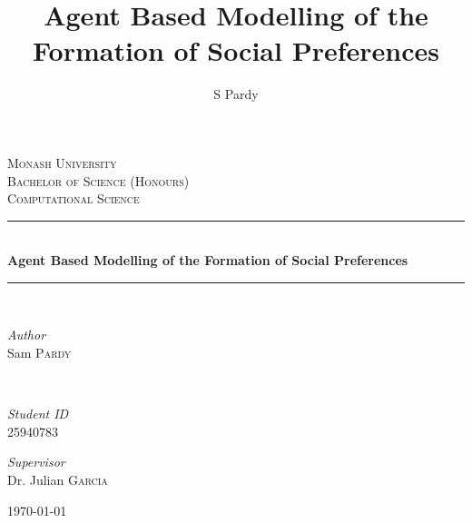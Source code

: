 \documentclass[11pt]{book}
\title{Agent Based Modelling of the Formation of Social Preferences}
\author{S Pardy}
\begin{document}
\begin{titlepage}
	\newcommand{\HRule}{\rule{\linewidth}{0.5mm}} %
	
	\center %
	
	
	\textsc{\LARGE Monash University}\\[1.5cm]	
	\textsc{\Large Bachelor of Science (Honours)}\\[0.5cm] %
	
	\textsc{\large Computational Science}\\[0.5cm] %
	
	
	\HRule\\[0.4cm]
	
	{\huge\bfseries Agent Based Modelling of the Formation of Social Preferences}\\[0.4cm]
	
	\HRule\\[1.5cm]
	
	
	\begin{minipage}{0.4\textwidth}
		\begin{flushleft}
			\large
			\textit{Author}\\
			Sam \textsc{Pardy}
		\end{flushleft}
	\end{minipage}
	~
	\begin{minipage}{0.4\textwidth}
		\begin{flushright}
			\large 
			\textit{Student ID}\\
		25940783   
		\end{flushright}
	\end{minipage}
	\vfill
	\vfill
	{\large
	\textit{Supervisor}\\
	Dr. Julian \textsc{Garcia}}
	
	
	\vfill\vfill\vfill %
	
	{\large\today} %

	\vfill %
	
\end{titlepage}
\end{document}
